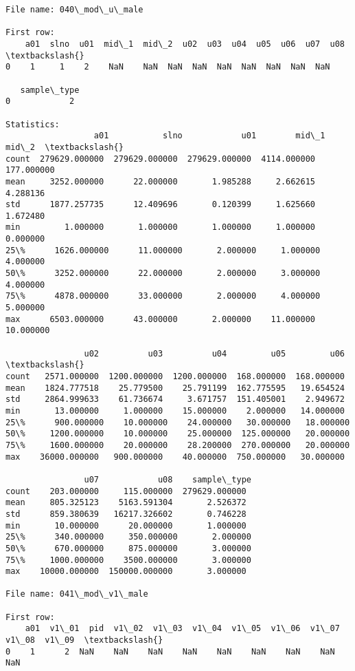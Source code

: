 \documentclass[11pt]{article}
\begin{document}
\begin{Verbatim}[commandchars=\\\{\}]
File name: 040\_mod\_u\_male

First row: 
    a01  slno  u01  mid\_1  mid\_2  u02  u03  u04  u05  u06  u07  u08  \textbackslash{}
0    1     1    2    NaN    NaN  NaN  NaN  NaN  NaN  NaN  NaN  NaN   

   sample\_type  
0            2  

Statistics: 
                  a01           slno            u01        mid\_1       mid\_2  \textbackslash{}
count  279629.000000  279629.000000  279629.000000  4114.000000  177.000000   
mean     3252.000000      22.000000       1.985288     2.662615    4.288136   
std      1877.257735      12.409696       0.120399     1.625660    1.672480   
min         1.000000       1.000000       1.000000     1.000000    0.000000   
25\%      1626.000000      11.000000       2.000000     1.000000    4.000000   
50\%      3252.000000      22.000000       2.000000     3.000000    4.000000   
75\%      4878.000000      33.000000       2.000000     4.000000    5.000000   
max      6503.000000      43.000000       2.000000    11.000000   10.000000   

                u02          u03          u04         u05         u06  \textbackslash{}
count   2571.000000  1200.000000  1200.000000  168.000000  168.000000   
mean    1824.777518    25.779500    25.791199  162.775595   19.654524   
std     2864.999633    61.736674     3.671757  151.405001    2.949672   
min       13.000000     1.000000    15.000000    2.000000   14.000000   
25\%      900.000000    10.000000    24.000000   30.000000   18.000000   
50\%     1200.000000    10.000000    25.000000  125.000000   20.000000   
75\%     1600.000000    20.000000    28.200000  270.000000   20.000000   
max    36000.000000   900.000000    40.000000  750.000000   30.000000   

                u07            u08    sample\_type  
count    203.000000     115.000000  279629.000000  
mean     805.325123    5163.591304       2.526372  
std      859.380639   16217.326602       0.746228  
min       10.000000      20.000000       1.000000  
25\%      340.000000     350.000000       2.000000  
50\%      670.000000     875.000000       3.000000  
75\%     1000.000000    3500.000000       3.000000  
max    10000.000000  150000.000000       3.000000  

File name: 041\_mod\_v1\_male

First row: 
    a01  v1\_01  pid  v1\_02  v1\_03  v1\_04  v1\_05  v1\_06  v1\_07  v1\_08  v1\_09  \textbackslash{}
0    1      2  NaN    NaN    NaN    NaN    NaN    NaN    NaN    NaN    NaN   


\end{Verbatim}
\end{document}
